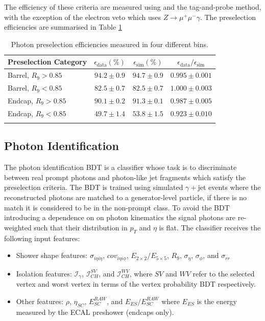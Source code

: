 The efficiency of these criteria are measured using \Zee and the tag-and-probe method, 
with the exception of the electron veto which uses $Z\rightarrow{}\mu^{+}\mu^{-}\gamma$. The preselection efficiencies are summarised in Table \ref{tab:object_reco:presel_eff}
\begin{table}[h!]
    \centering
    \renewcommand{\arraystretch}{1.3}
    \begin{tabular}{ l | c c c }
        \thickhline
        Preselection Category& $\epsilon_{\mathrm{data}} (\%)$ & $\epsilon_{\mathrm{sim}} (\%)$ & $\epsilon_{\mathrm{data}}/\epsilon_{\mathrm{sim}}$ \\
        \hline
        Barrel, $R_{9}>0.85$ & $94.2\pm0.9$ & $94.7\pm0.9$ & $0.995\pm0.001$ \\
        Barrel, $R_{9}<0.85$ & $82.5\pm0.7$ & $82.5\pm0.7$ & $1.000\pm0.003$ \\ 
        \hline
        Endcap, $R_{9}>0.85$ & $90.1\pm0.2$ & $91.3\pm0.1$ & $0.987\pm0.005$ \\ 
        Endcap, $R_{9}<0.85$ & $49.7\pm1.4$ & $53.8\pm1.5$ & $0.923\pm0.010$ \\ 
        \thickhline
\end{tabular}
    \caption{Photon preselection efficiencies measured in four different bins.}
    \label{tab:object_reco:presel_eff}
\end{table}





\subsection{Photon Identification}
The photon identification BDT is a classifier whose task is to discriminate between real prompt photons and photon-like jet fragments which satisfy the preselection criteria. 
The BDT is trained using simulated $\gamma + $jet events where the reconstructed photons are matched to a generator-level particle, if there is no match it is considered to be in the non-prompt class.
To avoid the BDT introducing a dependence on on photon kinematics the signal photons are re-weighted such that their distribution in $p_{T}$ and $\eta$ is flat. 
The classifier receives the following input features:
\begin{itemize}[noitemsep]
    \item Shower shape features: $\sigma_{i\eta{}i\eta}$, $cov_{i\eta{}i\phi}$, $E_{2\times{}2}/E_{5\times{}5}$, $R_{9}$, $\sigma_{\eta}$, $\sigma_{\phi}$, and $\sigma_{rr}$
    \item Isolation features: $\mathcal{I}_{\gamma}$, $\mathcal{I}_{CH}^{SV}$, and $\mathcal{I}_{CH}^{WV}$, where $SV$ and $WV$ refer to the selected vertex and worst vertex in terms of the vertex probability BDT respectively. 
    \item Other features: $\rho$, $\eta_{SC}$, $E_{SC}^{RAW}$, and $E_{ES}/E_{SC}^{RAW}$ where $E_{ES}$ is the energy measured by the ECAL preshower (endcaps only).
\end{itemize}

